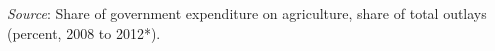 \footnotebar
\textit{Source}: Share of government expenditure on agriculture, share of total outlays (percent,
2008 to 2012*). 

